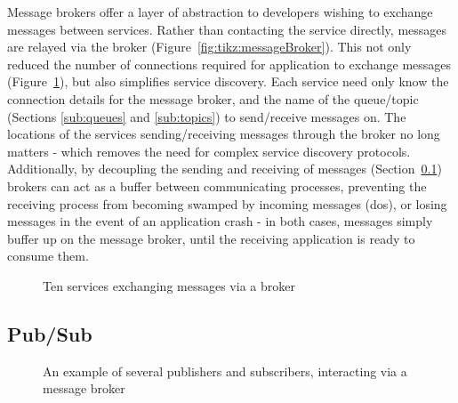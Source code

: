 Message brokers offer a layer of abstraction to developers wishing to exchange
messages between services. Rather than contacting the service directly, messages
are relayed via the broker (Figure~\ref{fig:tikz:messageBroker}). This not only
reduced the number of connections required for application to exchange messages
(Figure~\ref{fig:tikz:complexBrokerMessaging}), but also simplifies service
discovery. Each service need only know the connection details for the message
broker, and the name of the queue/topic (Sections \ref{sub:queues} and
\ref{sub:topics}) to send/receive messages on. The locations of the services
sending/receiving messages through the broker no long matters - which removes
the need for complex service discovery protocols. Additionally, by decoupling
the sending and receiving of messages (Section~\ref{sub:pubsub}) brokers can act
as a buffer between communicating processes, preventing the receiving process
from becoming swamped by incoming messages (\gls{dos}), or losing messages in
the event of an application crash - in both cases, messages simply buffer up on
the message broker, until the receiving application is ready to consume them.

\begin{figure}[htbp]
  \centering
  
  \caption{Ten services exchanging messages via a broker}
  \label{fig:tikz:complexBrokerMessaging}
\end{figure}

\subsection{Pub/Sub}
\label{sub:pubsub}

\begin{figure}[htbp]
  \centering
  
  \caption{An example of several publishers and subscribers, interacting via a
  message broker}
  \label{fig:tikz:queuesInsideBroker}
\end{figure}

